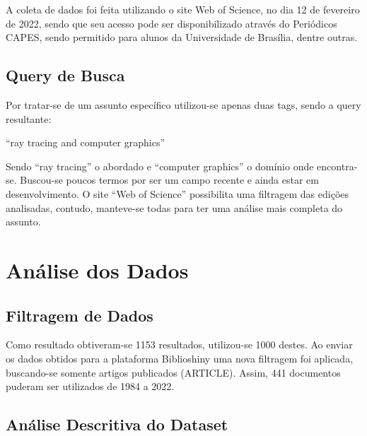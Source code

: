A coleta de dados foi feita utilizando o site Web of Science, no dia 12 de fevereiro de 2022, sendo que seu acesso pode ser disponibilizado através do Periódicos CAPES, sendo permitido para alunos da Universidade de Brasília, dentre outras.

\subsection{Query de Busca}

Por tratar-se de um assunto específico utilizou-se apenas duas tags, sendo a query resultante:

“ray tracing and computer graphics”

Sendo “ray tracing” o abordado e “computer graphics” o domínio onde encontra-se. Buscou-se poucos termos por ser um campo recente e ainda estar em desenvolvimento. O site “Web of Science” possibilita uma filtragem das edições analisadas, contudo, manteve-se todas para ter uma análise mais completa do assunto.

\section{Análise dos Dados}

\subsection{Filtragem de Dados}

Como resultado obtiveram-se 1153 resultados, utilizou-se 1000 destes. Ao enviar os dados obtidos para a plataforma Biblioshiny uma nova filtragem foi aplicada, buscando-se somente artigos publicados (ARTICLE). Assim, 441 documentos puderam ser utilizados de 1984 a 2022.

\subsection{Análise Descritiva do Dataset}

